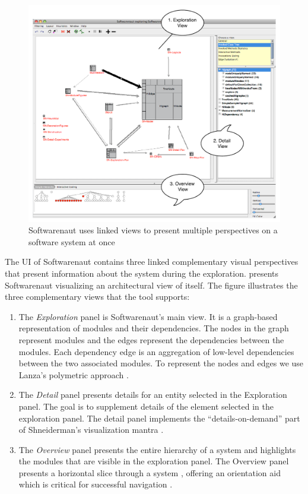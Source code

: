 \documentclass[preprint,12pt]{elsarticle}
\begin{document}
\begin{figure}[ht]
\begin{center}
\includegraphics[width=\linewidth]{SnautOnSnaut.pdf}
\caption{Softwarenaut uses linked views to present multiple perspectives on a software system at once}
\end{center}
\end{figure}

The UI of Softwarenaut contains three linked complementary visual perspectives that present information about the system during the exploration.  presents Softwarenaut visualizing an architectural view of itself. The figure illustrates the three complementary views that the tool supports:

\begin{enumerate}

\item The {\em Exploration} panel is Softwarenaut's main view. It is a graph-based representation of modules and their dependencies. The nodes in the graph represent modules and the edges represent the dependencies between the modules. Each dependency edge is an aggregation of low-level dependencies between the two associated modules. To represent the nodes and edges we use Lanza's polymetric approach \cite{lanza-pv, lanza-oomp}. 

\item The {\em Detail} panel presents details for an entity selected in the Exploration panel. The goal is to supplement details of the element selected in the exploration panel. The detail panel implements the ``details-on-demand'' part of Shneiderman's visualization mantra \cite{shneid-eyes}.

\item The {\em Overview} panel presents the entire hierarchy of a system and highlights the modules that are visible in the exploration panel. The Overview panel presents a horizontal slice through a system \cite{wong-thesis}, offering an orientation aid which is critical for successful navigation \cite{storey-awareness}.

\end{enumerate}
\end{document}
